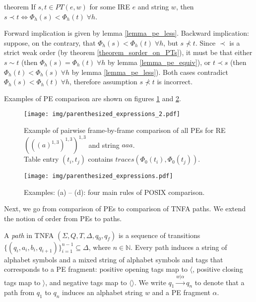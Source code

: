 \documentclass[AMA,STIX1COL]{WileyNJD-v2}
\newcommand{\Xl}{\langle}
\newcommand{\Xr}{\rangle}
\newcommand{\Xm}{\langle\!\rangle}
\newcommand{\YN}{\mathbb{N}}
\newcommand{\PT}{PT}
\begin{document}
\begin{theoremEnd}[restate, no link to proof, no link to theorem, category=theorem_order_on_pe_same_as_on_pt]{theorem}
    \label{theorem_order_on_pe_same_as_on_pt}
    If $s, t \in \PT(e, w)$ for some IRE $e$ and string $w$, then
    $s \prec t \Leftrightarrow \Phi_{h}(s) < \Phi_{h}(t) \; \forall h$.
\end{theoremEnd}
\begin{proofEnd}
    Forward implication is given by lemma \ref{lemma_pe_less}.
    Backward implication:
    suppose, on the contrary, that $\Phi_{h}(s) < \Phi_{h}(t) \; \forall h$, but $s \not\prec t$.
    Since $\prec$ is a strict weak order (by theorem \ref{theorem_sorder_on_PTs}),
    it must be that either $s \sim t$
    (then $\Phi_{h}(s) = \Phi_{h}(t) \; \forall h$ by lemma \ref{lemma_pe_equiv}),
    or $t \prec s$
    (then $\Phi_{h}(t) < \Phi_{h}(s) \; \forall h$ by lemma \ref{lemma_pe_less}).
    Both cases contradict $\Phi_{h}(s) < \Phi_{h}(t) \; \forall h$,
    therefore assumption $s \not\prec t$ is incorrect.
\end{proofEnd}

Examples of PE comparison are shown on figures \ref{fig:pe2} and \ref{fig:pe}.

\begin{figure}[b!]
\vspace{-2em}
\texttt{[image: img/parenthesized\_expressions\_2.pdf]}
\vspace{-2em}
\caption{
Example of pairwise frame-by-frame comparison
of all PEs for RE $(((a)^{1,3})^{1,3})^{1,3}$ and string $aaa$.\\
Table entry $(t_i, t_j)$ contains $traces(\Phi_0(t_i), \Phi_0(t_j))$.
}\label{fig:pe2}
\end{figure}

\begin{figure}%
\texttt{[image: img/parenthesized\_expressions.pdf]}
\vspace{-2em}
\caption{
Examples: (a) -- (d): four main rules of POSIX comparison.
}\label{fig:pe}
\end{figure}


Next, we go from comparison of PEs to comparison of TNFA paths.
We extend the notion of order from PEs to paths.

    \begin{definition}[Path]
    A \emph{path} in TNFA $(\Sigma, Q, T, \Delta, q_0, q_f)$
    is a sequence of transitions $\{(q_i, a_i, b_i, q_{i + 1})\}_{i=1}^{n-1} \subseteq \Delta$, where $n \in \YN$.
    Every path induces a string of alphabet symbols
    and a mixed string of alphabet symbols and tags that corresponds to a PE fragment:
    positive opening tags map to $\Xl$,
    positive closing tags map to $\Xr$,
    and negative tags map to $\Xm$.
    We write $q_1 \overset {w|\alpha} {\longrightarrow} q_n$
    to denote that a path from $q_1$ to $q_n$ induces
    an alphabet string $w$
    and a PE fragment $\alpha$.
    \end{definition}
\end{document}
